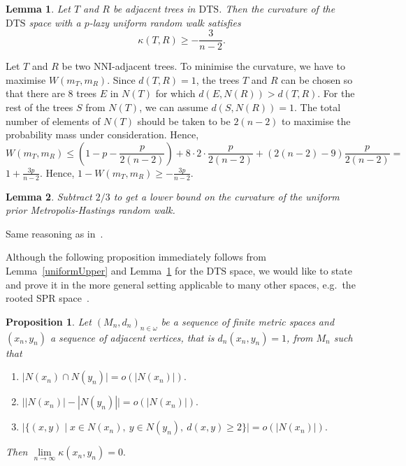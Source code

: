 \documentclass{amsart}
\newtheorem{lemma}{Lemma}
\newtheorem{proposition}{Proposition}
\newcommand{\dts}{\mathrm{DTS}}
\begin{document}
\begin{lemma}\label{uniformLower}
Let $T$ and $R$ be adjacent trees in $\dts$. Then the curvature of the $\dts$
space with a $p$-lazy uniform random walk satisfies
\[
\kappa(T,R) \geq -\frac{3}{n-2}.
\]
\end{lemma}

\proof
Let $T$ and $R$ be two NNI-adjacent trees. To minimise the curvature, we have
to maximise $W(m_T, m_R)$. Since $d(T, R) = 1$, the trees $T$ and $R$ can be
chosen so that there are 
$8$ trees $E$ in $N(T)$ for which 
$d(E, N(R)) > d(T, R)$. 
For the rest of the trees $S$ from $N(T)$, we can assume $d(S, N(R)) = 1$.
The total number of elements of $N(T)$ should be taken to be $2(n-2)$ to 
maximise the probability mass under consideration.
Hence, 
\[
W(m_T,m_R)\leq (1 - p - \frac{p}{2(n - 2)}) + 
8 \cdot 2 \cdot \frac{p}{2(n - 2)} +
(2(n - 2) - 9)\frac{p}{2(n-2)} =
\]
$1 + \displaystyle\frac{3p}{n-2}.$ 
Hence, $1 - W(m_T,m_R) \geq - \displaystyle\frac{3p}{n-2}.$
\endproof

\begin{lemma}
Subtract $2/3$ to get a lower bound on the curvature of the
uniform prior Metropolis-Hastings random walk.
\end{lemma}

\proof
Same reasoning as in~\cite{Whidden2015-es}. 
\endproof

Although the following proposition immediately follows from 
Lemma~\ref{uniformUpper} and Lemma~\ref{uniformLower} for the $\dts$ space,
we would like to state and prove it in the more general setting applicable 
to many other spaces, e.g.\ the rooted SPR space~\cite{Whidden2015-es}. 

\begin{proposition}
Let $(M_n,d_n)_{n \in \omega}$ be a sequence of finite metric spaces and 
$(x_n, y_n)$ a sequence of adjacent vertices, that is $d_n(x_n,y_n) = 1$,
from $M_n$ such that
\begin{enumerate}[(1)]
\item $\big|N(x_n) \cap N(y_n)\big| = o(|N(x_n)|).$ 
\item $\big||N(x_n)| - |N(y_n)|\big| = o(|N(x_n)|).$ 
\item $\big|\{(x,y) \mid x \in N(x_n),~ y \in N(y_n),~ d(x, y) \geq 2\}\big| 
= o(|N(x_n)|).$
\end{enumerate}

Then $\lim\limits_{n \to \infty} \kappa(x_n, y_n) = 0.$
\end{proposition}
\end{document}
